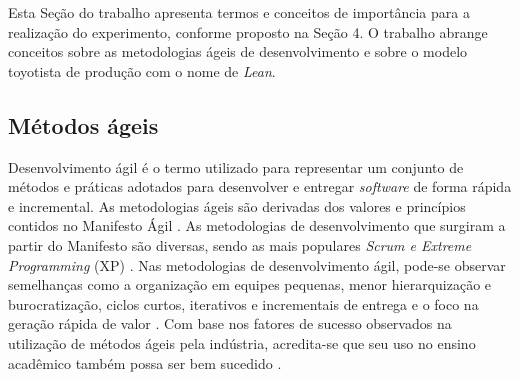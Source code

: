 Esta Seção do trabalho apresenta termos e conceitos de importância para a realização do experimento, conforme proposto na Seção 4. O trabalho abrange conceitos sobre as metodologias ágeis de desenvolvimento e sobre o modelo toyotista de produção com o nome de \textit{Lean}.

\subsection{Métodos ágeis}

Desenvolvimento ágil é o termo utilizado para representar um conjunto de métodos e práticas adotados para desenvolver e entregar \textit{software} de forma rápida e incremental. As metodologias ágeis são derivadas dos valores e princípios contidos no Manifesto Ágil \cite{Manifesto}. As metodologias de desenvolvimento que surgiram a partir do Manifesto são diversas, sendo as mais populares \textit{Scrum e Extreme Programming} (XP) \cite{poth2019lean}. Nas metodologias de desenvolvimento ágil, pode-se observar semelhanças como a organização em equipes pequenas, menor hierarquização e burocratização, ciclos curtos, iterativos e incrementais de entrega e o foco na geração rápida de valor \cite{wei2019}. Com base nos fatores de sucesso observados na utilização de métodos ágeis pela indústria, acredita-se que seu uso no ensino acadêmico também possa ser bem sucedido \cite{fernandes2019identifying}.



